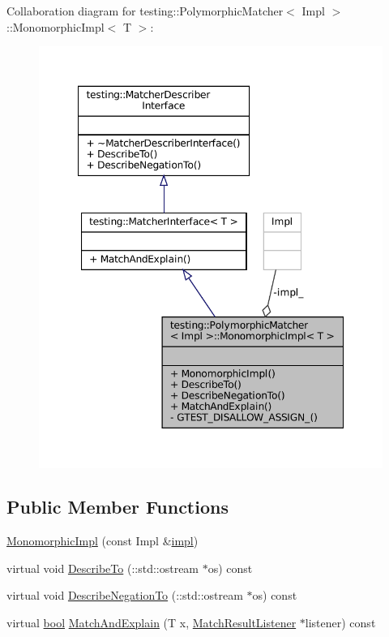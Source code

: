 Collaboration diagram for testing\+:\+:Polymorphic\+Matcher$<$ Impl $>$\+:\+:Monomorphic\+Impl$<$ T $>$\+:
\nopagebreak
\begin{figure}[H]
\begin{center}
\leavevmode
\includegraphics[width=348pt]{classtesting_1_1PolymorphicMatcher_1_1MonomorphicImpl__coll__graph}
\end{center}
\end{figure}
\subsection*{Public Member Functions}
\begin{DoxyCompactItemize}
\item 
\hyperlink{classtesting_1_1PolymorphicMatcher_1_1MonomorphicImpl_a83b488f9db4ef0552949abdecc4eaf30}{Monomorphic\+Impl} (const Impl \&\hyperlink{classtesting_1_1PolymorphicMatcher_ab10e4858d8dc903d3e1e378d53d25882}{impl})
\item 
virtual void \hyperlink{classtesting_1_1PolymorphicMatcher_1_1MonomorphicImpl_aa98a5eecc47f87bc297231a88714e33e}{Describe\+To} (\+::std\+::ostream $\ast$os) const
\item 
virtual void \hyperlink{classtesting_1_1PolymorphicMatcher_1_1MonomorphicImpl_a699910683db97c94f23da3e131604e76}{Describe\+Negation\+To} (\+::std\+::ostream $\ast$os) const
\item 
virtual \hyperlink{classbool}{bool} \hyperlink{classtesting_1_1PolymorphicMatcher_1_1MonomorphicImpl_a536a47d5addc2134a3f7509a175b1580}{Match\+And\+Explain} (T x, \hyperlink{classtesting_1_1MatchResultListener}{Match\+Result\+Listener} $\ast$listener) const
\end{DoxyCompactItemize}
